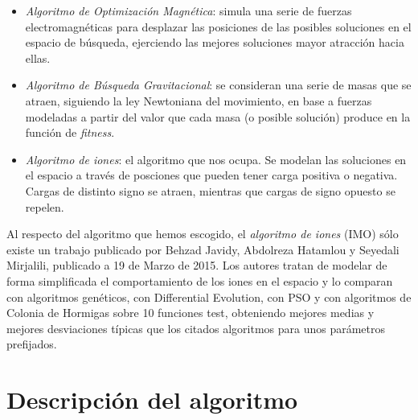 \documentclass[a4paper,11pt]{article}
\begin{document}
\begin{itemize}
  \begin{itemize}
    \item \textit{Algoritmo de Optimización Magnética}: simula una serie de fuerzas electromagnéticas para desplazar las posiciones
    de las posibles soluciones en el espacio de búsqueda, ejerciendo las mejores soluciones mayor atracción hacia ellas.
    
    \item \textit{Algoritmo de Búsqueda Gravitacional}: se consideran una serie de masas que se atraen, siguiendo la ley
    Newtoniana del movimiento, en base a fuerzas modeladas a partir del valor que cada masa (o posible solución) produce
    en la función de \textit{fitness}.
    
    \item \textit{Algoritmo de iones}: el algoritmo que nos ocupa. Se modelan las soluciones en el espacio a través de posciones
    que pueden tener carga positiva o negativa. Cargas de distinto signo se atraen, mientras que cargas de signo opuesto se repelen.
  \end{itemize}
\end{itemize}

Al respecto del algoritmo que hemos escogido, el \textit{algoritmo de iones} (IMO) sólo existe un trabajo publicado por Behzad Javidy, 
Abdolreza Hatamlou y Seyedali Mirjalili, publicado a 19 de Marzo de 2015. Los autores tratan de modelar de forma
simplificada el comportamiento de los iones en el espacio y lo comparan con algoritmos genéticos, con Differential Evolution,
con PSO y con algoritmos de Colonia de Hormigas sobre 10 funciones test, obteniendo mejores medias y mejores desviaciones
típicas que los citados algoritmos para unos parámetros prefijados.

\section{Descripción del algoritmo}
\end{document}
